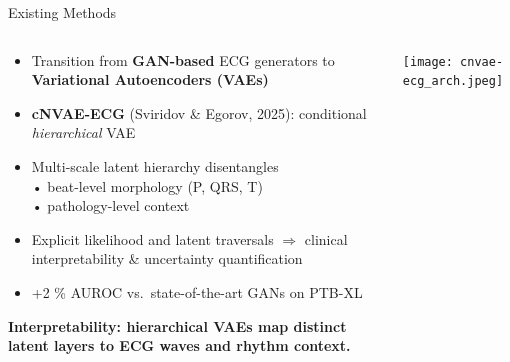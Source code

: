 \documentclass[aspectratio=169,11pt]{beamer}
\newcommand{\highlightbox}[2][tcairemred]{%
  \begin{center}
    \colorbox{#1!20}{\parbox{0.9\textwidth}{\centering\textcolor{#1}{\textbf{#2}}}}
  \end{center}}
\begin{document}
\begin{frame}{Existing Methods}
  \begin{columns}[T]
    \begin{column}{0.48\textwidth}
      \begin{itemize}
        \item Transition from \textbf{GAN-based} ECG generators to \textbf{Variational Autoencoders (VAEs)}
        \item \textbf{cNVAE-ECG} \tiny(Sviridov \& Egorov, 2025)\normalsize: conditional \emph{hierarchical} VAE
        \item Multi-scale latent hierarchy disentangles\\[-0.3em]
              \hspace{1em}• beat-level morphology (P, QRS, T)\\[-0.3em]
              \hspace{1em}• pathology-level context
        \item Explicit likelihood and latent traversals $\Rightarrow$ clinical interpretability \& uncertainty quantification
        \item +2 \% AUROC vs.\ state-of-the-art GANs on PTB-XL
      \end{itemize}

      \highlightbox[tcairemred]{Interpretability: hierarchical VAEs map distinct latent layers to ECG waves and rhythm context.}
    \end{column}

    \begin{column}{0.52\textwidth}
      \begin{center}
        \texttt{[image: cnvae-ecg\_arch.jpeg]}
      \end{center}
    \end{column}
  \end{columns}
\end{frame}
\end{document}
